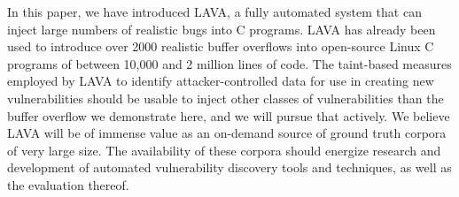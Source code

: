 In this paper, we have introduced LAVA, a fully automated system that can inject large numbers of realistic bugs into C programs.
LAVA has already been used to introduce over 2000 realistic buffer overflows into open-source Linux C programs of between 10,000 and 2 million lines of code.  
The taint-based measures employed by LAVA to identify attacker-controlled data for use in creating new vulnerabilities should be usable to inject other classes of vulnerabilities than the buffer overflow we demonstrate here, and we will pursue that actively.  
We believe LAVA will be of immense value as an on-demand source of ground truth corpora of very large size.
The availability of these corpora should energize research and development of automated vulnerability discovery tools and techniques, as well as the evaluation thereof.



